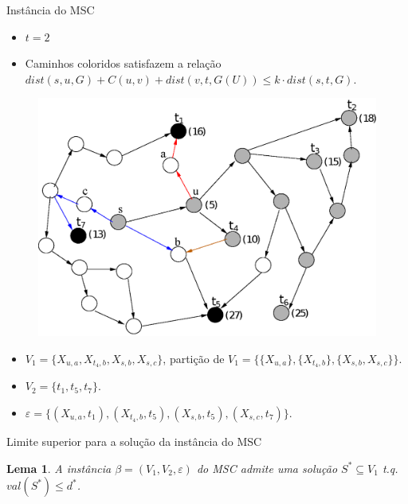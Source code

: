 \documentclass[10pt]{beamer}
\newtheorem{lema}{Lema}
\begin{document}
\begin{frame}{Instância do MSC}
\scriptsize  
\begin{itemize}
  \item $t = 2$
  \item Caminhos coloridos satisfazem a relação $dist(s, u, G) + C(u, v) + dist(v,t,G(U)) \leq k \cdot dist(s,t,G)$.
\end{itemize}
\begin{figure}[H]
\centering
\includegraphics[scale=0.45]{imagens/mscInstance}
\label{fig:fig}
\end{figure}

\scriptsize
\begin{itemize}
  \item <2-> $V_1 = \{ X_{u,a}, X_{t_4,b}, X_{s,b}, X_{s,c} \}$, partição de $V_1 = \{ \{ X_{u,a} \}, \{ X_{t_4,b} \}, \{ X_{s,b}, X_{s,c} \} \}$.
  \item <2-> $V_2 = \{ t_1, t_5, t_7 \}$.
  \item <2-> $\varepsilon = \{ (X_{u,a}, t_1), (X_{t_4,b}, t_5), (X_{s,b}, t_5), (X_{s,c}, t_7) \}$.
\end{itemize}

\end{frame}

\begin{frame}{Limite superior para a solução da instância do MSC}
  \begin{lema}
    \label{lem:val_solution}
    A instância $\beta=(V_1, V_2, \varepsilon)$ do MSC admite uma solução $S^* \subseteq V_1$ t.q. $val(S^*) \leq d^*$.
  \end{lema}
\hypertarget{val_solution}{}
\hyperlink{val_solution_slide}{}
\end{frame}
\end{document}
